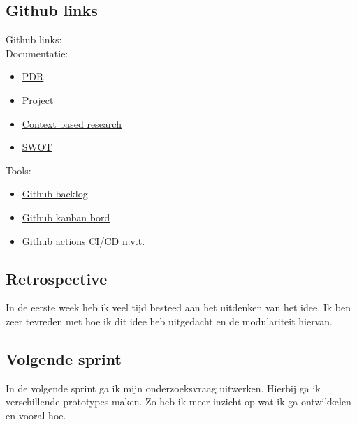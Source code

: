 \documentclass[11pt, twoside]{report}
\begin{document}
    \subsection{Github links}\label{subsec:github-links}
    Github links:\\
    \newline
    Documentatie:
    \begin{itemize}
        \item \href{https://github.com/rikp777/RP-Flowcontrol/blob/master/documentation/PDR/out/PDR_Rik_Peeters.pdf}{PDR}
        \item \href{https://github.com/rikp777/RP-Flowcontrol/blob/master/documentation/project/out/Project_Rik_Peeters.pdf}{Project}
        \item \href{https://github.com/rikp777/RP-Flowcontrol/blob/master/documentation/context_based_research/out/context_based_research_Rik_Peeters.pdf}{Context based research}
        \item \href{https://github.com/rikp777/RP-Flowcontrol/blob/master/documentation/SWOT/out/SWOT_Rik_Peeters.pdf}{SWOT}
    \end{itemize}
    \newline
    Tools:
    \begin{itemize}
        \item \href{https://github.com/rikp777/RP-Flowcontrol/issues}{Github backlog}
        \item \href{https://github.com/rikp777/RP-Flowcontrol/projects/1}{Github kanban bord}
        \item Github actions CI/CD n.v.t.
    \end{itemize}

    \subsection{Retrospective}\label{subsec:retrospective}
    In de eerste week heb ik veel tijd besteed aan het uitdenken van het idee.
    Ik ben zeer tevreden met hoe ik dit idee heb uitgedacht en de modulariteit hiervan.

    \subsection{Volgende sprint}\label{subsec:volgende-sprint}
    In de volgende sprint ga ik mijn onderzoeksvraag uitwerken.
    Hierbij ga ik verschillende prototypes maken.
    Zo heb ik meer inzicht op wat ik ga ontwikkelen en vooral hoe.
\end{document}
